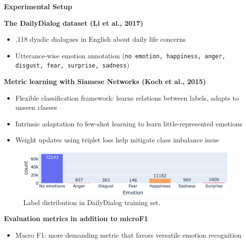 \documentclass[final,hyperref={pdfpagelabels=false},unknownkeysallowed]{beamer} %
\begin{document}
\begin{frame}
  \begin{minipage}{0.475\textwidth}
    \begin{block}{\textbf{Experimental Setup}}
\begin{center}
  \textbf{The DailyDialog dataset \textcolor{aclblue}{\small(Li et al., 2017)}}
\end{center}
\begin{itemize}
  \item {},118 dyadic dialogues in English about daily life concerns
  \item \enspace \textcolor{lbmagenta}{Utterance-wise} emotion annotation (\texttt{no emotion, happiness, anger, disgust, fear, surprise, sadness})
\end{itemize}
\vspace{2ex}
\begin{center}
\textbf{Metric learning with Siamese Networks \textcolor{aclblue}{\small(Koch et al., 2015)}}
\end{center}
\begin{itemize}
  \item\enspace Flexible classification framework: learns \textcolor{lbmagenta}{relations between labels}, adapts to unseen classes
  \item\enspace Intrinsic adaptation to few-shot learning to learn little-represented emotions 
  \item\enspace Weight updates using \textcolor{lbmagenta}{triplet loss} help mitigate  \textcolor{lbmagenta}{class imbalance} issue
\end{itemize}
\vspace{2ex}
\begin{figure}
  \centering
  \includegraphics[width=\textwidth]{images/emo-dist-veryFlat.png}
  \caption{Label distribution in DailyDialog training set.}
\end{figure}
\vspace{1ex}
\begin{center}
  \textbf{Evaluation metrics in addition to microF1}
\end{center}
\begin{itemize}
  \item\enspace \textcolor{lbmagenta}{Macro F1}: more demanding metric that favors versatile emotion recognition

\end{itemize}
\end{block}
\end{minipage}
\end{frame}
\end{document}
